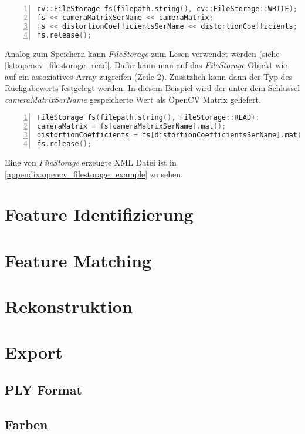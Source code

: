\begin{lstlisting}[language=c++, numbers=left, breaklines=true, breakatwhitespace=false, label=lst:opencv_filestorage, caption=Schreiben mit OpenCV Filestorage]
cv::FileStorage fs(filepath.string(), cv::FileStorage::WRITE);
fs << cameraMatrixSerName << cameraMatrix;
fs << distortionCoefficientsSerName << distortionCoefficients;
fs.release();
\end{lstlisting}

Analog zum Speichern kann \emph{FileStorage} zum Lesen verwendet werden (siehe \autoref{lst:opencv_filestorage_read}.
Dafür kann man auf das \emph{FileStorage} Objekt wie auf ein assoziatives Array zugreifen (Zeile 2).
Zusätzlich kann dann der Typ des Rückgabewerts festgelegt werden.
In diesem Beispiel wird der unter dem Schlüssel \emph{cameraMatrixSerName} gespeicherte Wert als OpenCV Matrix geliefert.

\begin{lstlisting}[language=c++, numbers=left, breaklines=true, breakatwhitespace=false, label=lst:opencv_filestorage_read, caption=Lesen mit OpenCV Filestorage]
FileStorage fs(filepath.string(), FileStorage::READ);
cameraMatrix = fs[cameraMatrixSerName].mat();
distortionCoefficients = fs[distortionCoefficientsSerName].mat();
fs.release();
\end{lstlisting}


Eine von \emph{FileStorage} erzeugte XML Datei ist in \autoref{appendix:opencv_filestorage_example}  zu sehen.

\section{Feature Identifizierung}

\section{Feature Matching}

\section{Rekonstruktion}

\section{Export}
\subsection{PLY Format}
\subsection{Farben}
